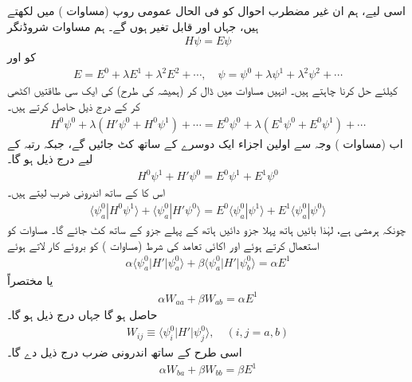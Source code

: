 اسی لیے، ہم ان  غیر مضطرب احوال کو فی الحال عمومی روپ (مساوات ) میں لکھتے ہیں، جہاں  اور  قابل تغیر ہوں گے۔ ہم مساوات شروڈنگر
\begin{align}\label{مساوات_غیر_مضطرب_مساوات_شروڈنگر}
H \psi = E \psi
\end{align}
کو  اور 
\begin{align}
E = E^0 + \lambda E^1 + \lambda^2 E^2 + \cdots, \quad \psi = \psi^0 + \lambda \psi^1 + \lambda^2 \psi^2 + \cdots
\end{align}
کیلئے حل کرنا چاہتے ہیں۔ انہیں مساوات  میں ڈال کر (ہمیشہ کی طرح)  کی ایک سی  طاقتیں اکٹھی کر کے درج ذیل حاصل کرتے ہیں۔
\begin{align*}
H^0 \psi^0 + \lambda (H' \psi^0 + H^0 \psi^1) + \cdots = E^0 \psi^0 + \lambda (E^1 \psi^0 + E^0 \psi^1) + \cdots
\end{align*}
اب  (مساوات ) وجہ سے اولین اجزاء ایک دوسرے کے ساتھ کٹ جائیں گے، جبکہ  رتبہ کے لیے درج ذیل ہو گا۔
\begin{align}
H^0 \psi^1 + H' \psi^0 = E^0 \psi^1 + E^1 \psi^0
\end{align}
اس کا  کے ساتھ اندرونی ضرب لیتے ہیں۔
\begin{align*} 
\langle \psi_a^0 | H^0 \psi^1 \rangle + \langle \psi_a^0 | H' \psi^0 \rangle = E^0 \langle \psi_a^0 | \psi^1 \rangle + E^1 \langle \psi_a^0 | \psi^0 \rangle
\end{align*}
چونکہ  ہرمشی ہے، لہٰذا بائیں ہاتھ پہلا جزو دائیں ہاتھ کے پہلے جزو کے ساتھ کٹ جائے گا۔ مساوات  کو استعمال کرتے ہوئے اور اکائی تعامد کی شرط (مساوات ) کو بروئے کار لاتے ہوئے 
\begin{align*}
\alpha \langle \psi_a^0 | H' | \psi_a^0 \rangle + \beta \langle \psi_a^0 | H' | \psi_b^0 \rangle = \alpha E^1
\end{align*}
یا مختصراً
\begin{align}\label{مساوات_غیر_مضطرب_اندرونی_ضرب_اول}
\alpha W_{aa} + \beta W_{ab} = \alpha E^1
\end{align}
حاصل ہو گا جہاں درج ذیل ہو گا۔
\begin{align}\label{مساوات_غیر_مضطرب_مختصر}
W_{ij} \equiv \langle \psi_i^0 | H' | \psi_j^0 \rangle, \quad (i, j = a, b)
\end{align}
اسی طرح  کے ساتھ اندرونی ضرب درج ذیل دے گا۔
\begin{align}\label{مساوات_غیر_مضطرب_اندرونی_ضرب_دوم}
\alpha W_{ba} + \beta W_{bb} = \beta E^1
\end{align}

